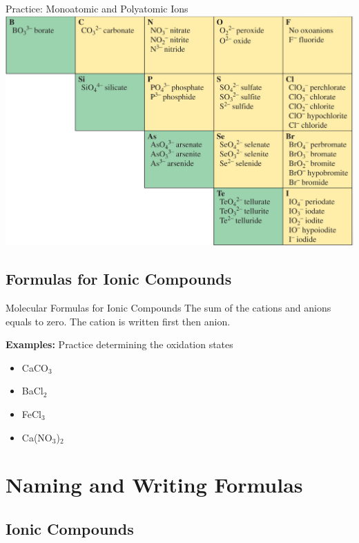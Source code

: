 \documentclass[11pt]{beamer}
\begin{document}
\begin{frame}{Practice: Monoatomic and Polyatomic Ions}
  \centering
  \includegraphics[width=\linewidth]{polyatomic_ion}
\end{frame}

\subsection{Formulas for Ionic Compounds}

\begin{frame}{Molecular Formulas for Ionic Compounds}
  The sum of the cations and anions equals to zero. The
  cation is written first then anion.

  \textbf{Examples:} Practice determining the oxidation states
  \begin{itemize}
  \item CaCO$_3$
  \item BaCl$_2$
  \item FeCl$_3$
  \item Ca(NO$_3$)$_2$
  \end{itemize}
\end{frame}

\section{Naming and Writing Formulas}

\subsection{Ionic Compounds}
\end{document}

